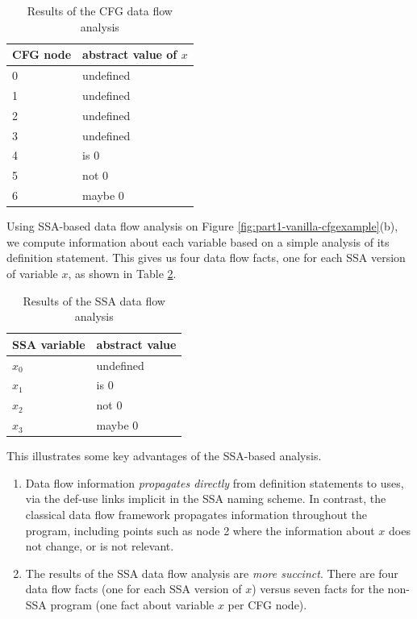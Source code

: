 \begin{table}
\begin{center}
\begin{tabular}{l|l} \hline
CFG node & abstract value of $x$ \\ \hline
0 & undefined \\
1 & undefined \\
2 & undefined \\
3 & undefined \\
4 & is 0 \\
5 & not 0 \\
6 & maybe 0 \\ \hline
\end{tabular}
\end{center}
\caption{\label{tab:part1-vanilla-cfgres}Results of the CFG data flow analysis}
\end{table}

Using SSA-based data flow analysis on Figure 
\ref{fig:part1-vanilla-cfgexample}(b),
we compute information about each variable based on a simple
analysis of its definition statement. This gives us four data flow facts,
one for each SSA version of variable $x$, as shown in Table
\ref{tab:part1-vanilla-ssares}.

\begin{table}
\begin{center}
\begin{tabular}{l|l} \hline
SSA variable & abstract value \\ \hline
$x_0$ & undefined \\
$x_1$ & is 0 \\
$x_2$ & not 0 \\
$x_3$ & maybe 0 \\ \hline
\end{tabular}
\end{center}
\caption{\label{tab:part1-vanilla-ssares}Results of the SSA data flow
  analysis}
\end{table}


This illustrates some key advantages of the SSA-based analysis.
\begin{enumerate}
\item Data flow information
\textit{propagates directly}
from definition statements to uses, via
the def-use links implicit in the SSA naming scheme. 
In contrast, the 
classical data flow framework 
propagates information throughout the program,
including points such as node 2 where the information 
about $x$ does not change, or is not relevant.
\item The results of the SSA data flow analysis are
\textit{more succinct}.
There are four data flow facts (one for each SSA version of $x$)
versus seven facts for the non-SSA program (one fact about variable $x$
per CFG node).
\end{enumerate}

